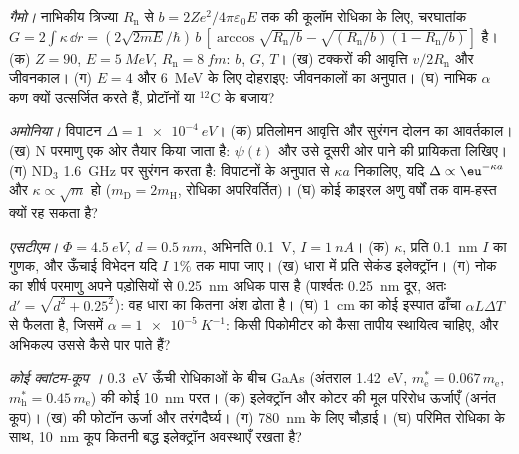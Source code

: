 \begin{exercise}[$\star\star$]\label{exo:b2:potential-wells-tunneling:9}
\emph{गैमो।} नाभिकीय त्रिज्या $R_{\text{n}}$ से
$b = 2Ze^2/4\pi\varepsilon_0E$ तक की कूलॉम रोधिका के लिए, चरघातांक $G = 2\int\kappa\,\dd r =
(2\sqrt{2mE}/\hbar)\,b\,[\arccos\sqrt{R_{\text{n}}/b} - \sqrt{(R_{\text{n}}/b)(1 -
R_{\text{n}}/b)}]$ है। (क) $Z = 90$, $E = \qty{5}{MeV}$, $R_{\text{n}} = \qty{8}{fm}$:
$b$, $G$, $T$। (ख) टक्करों की आवृत्ति $v/2R_{\text{n}}$ और जीवनकाल। (ग)
$E = 4$ और \qty{6}{MeV} के लिए दोहराइए: जीवनकालों का अनुपात। (घ) नाभिक
$\alpha$ कण क्यों उत्सर्जित करते हैं, प्रोटॉनों या $^{12}$C के बजाय?
\end{exercise}

\begin{exercise}[$\star\star\star$]\label{exo:b2:potential-wells-tunneling:10}
\emph{अमोनिया।} विपाटन $\Delta = \qty{1e-4}{eV}$। (क) प्रतिलोमन आवृत्ति
और सुरंगन दोलन का आवर्तकाल। (ख) N परमाणु एक ओर
तैयार किया जाता है: $\psi(t)$ और उसे दूसरी ओर पाने की प्रायिकता
लिखिए। (ग) ND$_3$ \qty{1.6}{GHz} पर सुरंगन करता है: विपाटनों के अनुपात से $\kappa a$
निकालिए, यदि $\Delta \propto \eu^{-\kappa a}$ और $\kappa
\propto\sqrt m$ हो ($m_{\text{D}} = 2m_{\text{H}}$, रोधिका अपरिवर्तित)। (घ) कोई काइरल अणु वर्षों तक वाम-हस्त क्यों रह
सकता है?
\end{exercise}

\begin{exercise}[$\star\star\star$]\label{exo:b2:potential-wells-tunneling:11}
\emph{एसटीएम।} $\Phi = \qty{4.5}{eV}$, $d = \qty{0.5}{nm}$, अभिनति \qty{0.1}{V},
$I = \qty{1}{nA}$। (क) $\kappa$, प्रति \qty{0.1}{nm} $I$ का गुणक, और
ऊँचाई विभेदन यदि $I$ $1\%$ तक मापा जाए। (ख) धारा में प्रति सेकंड
इलेक्ट्रॉन। (ग) नोक का शीर्ष परमाणु अपने पड़ोसियों से \qty{0.25}{nm} अधिक
पास है (पार्श्वतः \qty{0.25}{nm} दूर, अतः $d' = \sqrt{d^2 + 0.25^2}$):
वह धारा का कितना अंश ढोता है। (घ) \qty{1}{cm} का कोई इस्पात ढाँचा
$\alpha L\Delta T$ से फैलता है, जिसमें $\alpha = \qty{1e-5}{K^{-1}}$: किसी पिकोमीटर को कैसा तापीय
स्थायित्व चाहिए, और अभिकल्प उससे कैसे पार पाते हैं?
\end{exercise}

\begin{exercise}[$\star\star\star$]\label{exo:b2:potential-wells-tunneling:12}
\emph{कोई क्वांटम-कूप ।} \qty{0.3}{eV} ऊँची रोधिकाओं के बीच GaAs (अंतराल
\qty{1.42}{eV}, $m_{\text{e}}^* = 0.067\,m_{\text{e}}$, $m_{\text{h}}^* = 0.45\,m_{\text{e}}$)
की कोई \qty{10}{nm} परत। (क) इलेक्ट्रॉन और कोटर की मूल परिरोध
ऊर्जाएँ (अनंत कूप)। (ख)  की फोटॉन ऊर्जा और
तरंगदैर्घ्य। (ग) \qty{780}{nm} के लिए चौड़ाई। (घ) परिमित रोधिका के साथ,
\qty{10}{nm} कूप कितनी बद्ध इलेक्ट्रॉन अवस्थाएँ रखता है?
\end{exercise}

